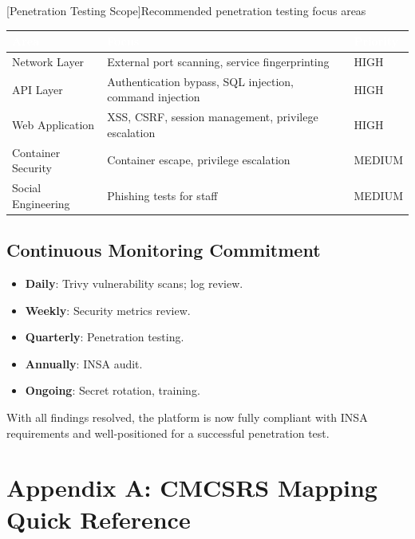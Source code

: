 \begin{center}
[Penetration Testing Scope]{Recommended penetration testing focus areas}
\label{tab:pentest}
\begin{tabular}{|p{}|p{}|p{}|}
\hline
\rowcolor{mooveblue}
\textcolor{white}{\textbf{Area}} & \textcolor{white}{\textbf{Focus}} & \textcolor{white}{\textbf{Priority}} \\
\hline
Network Layer & External port scanning, service fingerprinting & HIGH \\
API Layer & Authentication bypass, SQL injection, command injection & HIGH \\
Web Application & XSS, CSRF, session management, privilege escalation & HIGH \\
Container Security & Container escape, privilege escalation & MEDIUM \\
Social Engineering & Phishing tests for staff & MEDIUM \\
\hline
\end{tabular}
\end{center}

\subsection{Continuous Monitoring Commitment}
\begin{itemize}
    \item \textbf{Daily}: Trivy vulnerability scans; log review.
    \item \textbf{Weekly}: Security metrics review.
    \item \textbf{Quarterly}: Penetration testing.
    \item \textbf{Annually}: INSA audit.
    \item \textbf{Ongoing}: Secret rotation, training.
\end{itemize}

With all findings resolved, the platform is now fully compliant with INSA requirements and well‑positioned for a successful penetration test.

\appendix
\section{Appendix A: CMCSRS Mapping Quick Reference}


